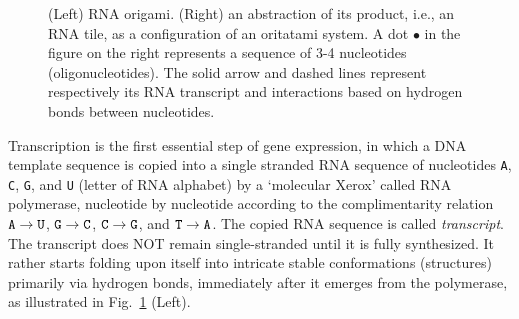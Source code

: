 \documentclass[runningheads]{llncs}
\begin{document}
\begin{figure}[htb]
\begin{minipage}{0.3\linewidth}
{}

\end{minipage}
\caption{
(Left) RNA origami. 
(Right) an abstraction of its product, i.e., an RNA tile, as a configuration of an oritatami system. 
A dot $\bullet$ in the figure on the right represents a sequence of 3-4 nucleotides (oligonucleotides). 
The solid arrow and dashed lines represent respectively its RNA transcript and interactions based on hydrogen bonds between nucleotides.
}
\label{fig:rna_origami}
\end{figure}

Transcription is the first essential step of gene expression, in which a DNA template sequence is copied into a single stranded RNA sequence of nucleotides {\tt A}, {\tt C}, {\tt G}, and {\tt U}  (letter of RNA alphabet) by a `molecular Xerox' called RNA polymerase, nucleotide by nucleotide according to the complimentarity relation ${\tt A} \rightarrow {\tt U}$, ${\tt G} \rightarrow {\tt C}$, ${\tt C} \rightarrow {\tt G}$, and ${\tt T} \rightarrow {\tt A}$. 
The copied RNA sequence is called \textit{transcript}. 
The transcript does NOT remain single-stranded until it is fully synthesized. 
It rather starts folding upon itself into intricate stable conformations (structures) primarily via hydrogen bonds, immediately after it emerges from the polymerase, as illustrated in Fig.~\ref{fig:rna_origami} (Left). 
\end{document}

